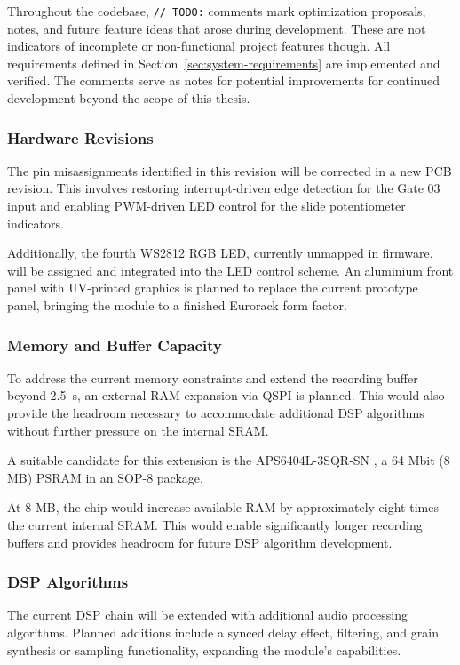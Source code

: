 Throughout the codebase, \texttt{// TODO:} comments mark optimization proposals, notes, and future feature ideas that arose during development.
These are not indicators of incomplete or non-functional project features though. 
All requirements defined in Section~\ref{sec:system-requirements} are implemented and verified.
The comments serve as notes for potential improvements for continued development beyond the scope of this thesis.

\subsubsection{Hardware Revisions}
The pin misassignments identified in this revision will be corrected in a new PCB revision. 
This involves restoring interrupt-driven edge detection for the Gate 03 input and enabling PWM-driven LED control for the slide potentiometer indicators. 

Additionally, the fourth WS2812 RGB LED, currently unmapped in firmware, will be assigned and integrated into the LED control scheme.
An aluminium front panel with UV-printed graphics is planned to replace the current  prototype panel, bringing the module to a finished Eurorack form factor.

\subsubsection{Memory and Buffer Capacity}
To address the current memory constraints and extend the recording buffer beyond  \qty{2.5}{\second}, an external RAM expansion via QSPI is planned. 
This would also provide the headroom necessary to accommodate additional DSP algorithms without further pressure on the internal SRAM.

A suitable candidate for this extension is the APS6404L-3SQR-SN \cite{APS6404L_3SQR}, a 64 Mbit (8 MB) PSRAM in an SOP-8 package.

At 8 MB, the chip would increase available RAM by approximately eight times the current internal SRAM. 
This would enable significantly longer recording buffers and provides headroom for future DSP algorithm development.

\subsubsection{DSP Algorithms}
The current DSP chain will be extended with additional audio processing algorithms. 
Planned additions include a synced delay effect, filtering, and grain synthesis or sampling functionality, expanding the module's capabilities.

